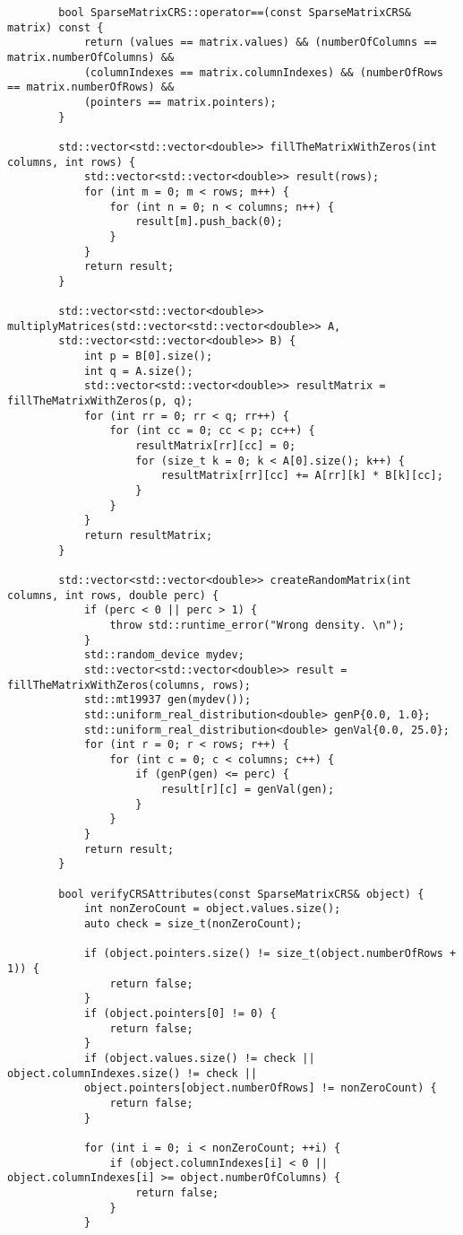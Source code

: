 \documentclass[a4paper, 14pt]{article}
\newcommand{\n}{\par}
\begin{document}
\begin{verbatim}
		bool SparseMatrixCRS::operator==(const SparseMatrixCRS& matrix) const {
			return (values == matrix.values) && (numberOfColumns == matrix.numberOfColumns) &&
			(columnIndexes == matrix.columnIndexes) && (numberOfRows == matrix.numberOfRows) &&
			(pointers == matrix.pointers);
		}
		
		std::vector<std::vector<double>> fillTheMatrixWithZeros(int columns, int rows) {
			std::vector<std::vector<double>> result(rows);
			for (int m = 0; m < rows; m++) {
				for (int n = 0; n < columns; n++) {
					result[m].push_back(0);
				}
			}
			return result;
		}
		
		std::vector<std::vector<double>> multiplyMatrices(std::vector<std::vector<double>> A,
		std::vector<std::vector<double>> B) {
			int p = B[0].size();
			int q = A.size();
			std::vector<std::vector<double>> resultMatrix = fillTheMatrixWithZeros(p, q);
			for (int rr = 0; rr < q; rr++) {
				for (int cc = 0; cc < p; cc++) {
					resultMatrix[rr][cc] = 0;
					for (size_t k = 0; k < A[0].size(); k++) {
						resultMatrix[rr][cc] += A[rr][k] * B[k][cc];
					}
				}
			}
			return resultMatrix;
		}
		
		std::vector<std::vector<double>> createRandomMatrix(int columns, int rows, double perc) {
			if (perc < 0 || perc > 1) {
				throw std::runtime_error("Wrong density. \n");
			}
			std::random_device mydev;
			std::vector<std::vector<double>> result = fillTheMatrixWithZeros(columns, rows);
			std::mt19937 gen(mydev());
			std::uniform_real_distribution<double> genP{0.0, 1.0};
			std::uniform_real_distribution<double> genVal{0.0, 25.0};
			for (int r = 0; r < rows; r++) {
				for (int c = 0; c < columns; c++) {
					if (genP(gen) <= perc) {
						result[r][c] = genVal(gen);
					}
				}
			}
			return result;
		}
		
		bool verifyCRSAttributes(const SparseMatrixCRS& object) {
			int nonZeroCount = object.values.size();
			auto check = size_t(nonZeroCount);
			
			if (object.pointers.size() != size_t(object.numberOfRows + 1)) {
				return false;
			}
			if (object.pointers[0] != 0) {
				return false;
			}
			if (object.values.size() != check || object.columnIndexes.size() != check ||
			object.pointers[object.numberOfRows] != nonZeroCount) {
				return false;
			}
			
			for (int i = 0; i < nonZeroCount; ++i) {
				if (object.columnIndexes[i] < 0 || object.columnIndexes[i] >= object.numberOfColumns) {
					return false;
				}
			}
			

\end{verbatim}
\end{document}
